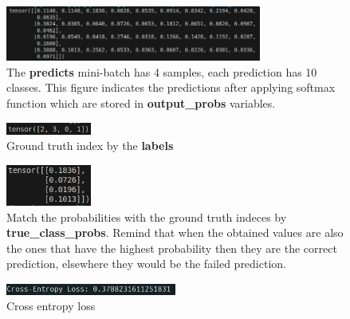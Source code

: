 
\begin{figure}[H]
    \includegraphics[width=0.75\textwidth]{images/cross1.png}
    \centering
    \caption{The \textbf{predicts} mini-batch has 4 samples, each prediction has 10 classes. This figure indicates the predictions after applying softmax function which are stored in \textbf{output\_probs} variables.}
    \label{fig:softmax}
\end{figure}

\begin{figure}[H]
    \includegraphics[width=0.25\textwidth]{images/cross2.png}
    \centering
    \caption{Ground truth index by the \textbf{labels}}
\end{figure}

\begin{figure}[H]
    \includegraphics[width=0.25\textwidth]{images/cross3.png}
    \centering
    \caption{Match the probabilities with the ground truth indeces by \textbf{true\_class\_probs}. Remind that when the obtained values are also the ones that have the highest probability then they are the correct prediction, elsewhere they would be the failed prediction.}
\end{figure}

\begin{figure}[H]
    \includegraphics[width=0.5\textwidth]{images/cross4.png}
    \centering
    \caption{Cross entropy loss}
\end{figure}

